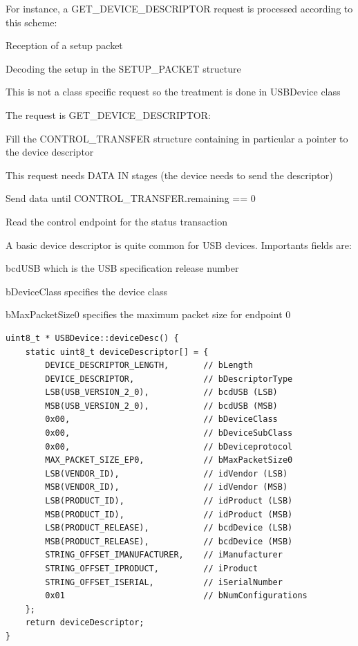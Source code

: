 \documentclass[pdftex,10pt,a4paper]{report}
\newenvironment{packed_item}{
\begin{itemize}
  \setlength{\itemsep}{1pt}
  \setlength{\parskip}{0pt}
  \setlength{\parsep}{0pt}
}{\end{itemize}}
\begin{document}
For instance, a GET\_DEVICE\_DESCRIPTOR request is processed according to this scheme:
\begin{packed_item}
	\item Reception of a setup packet
	\item Decoding the setup in the SETUP\_PACKET structure
	\item This is not a class specific request so the treatment is done in USBDevice class
	\item The request is GET\_DEVICE\_DESCRIPTOR:
	\begin{packed_item}
		\item Fill the CONTROL\_TRANSFER structure containing in particular a pointer to the device descriptor
		\item This request needs DATA IN stages (the device needs to send the descriptor)
		\item Send data until CONTROL\_TRANSFER.remaining == 0
		\item Read the control endpoint for the status transaction
	\end{packed_item}
\end{packed_item}


A basic device descriptor is quite common for USB devices. Importants fields are:
\begin{packed_item}	
	\item bcdUSB which is the USB specification release number
	\item bDeviceClass specifies the device class
	\item bMaxPacketSize0 specifies the maximum packet size for endpoint 0
\end{packed_item}

\begin{lstlisting}[label=Device Descriptor,caption=Device Descriptor]
uint8_t * USBDevice::deviceDesc() {
    static uint8_t deviceDescriptor[] = {
        DEVICE_DESCRIPTOR_LENGTH,       // bLength 
        DEVICE_DESCRIPTOR,              // bDescriptorType 
        LSB(USB_VERSION_2_0),           // bcdUSB (LSB) 
        MSB(USB_VERSION_2_0),           // bcdUSB (MSB) 
        0x00,                           // bDeviceClass 
        0x00,                           // bDeviceSubClass 
        0x00,                           // bDeviceprotocol 
        MAX_PACKET_SIZE_EP0,            // bMaxPacketSize0 
        LSB(VENDOR_ID),                 // idVendor (LSB) 
        MSB(VENDOR_ID),                 // idVendor (MSB) 
        LSB(PRODUCT_ID),                // idProduct (LSB) 
        MSB(PRODUCT_ID),                // idProduct (MSB) 
        LSB(PRODUCT_RELEASE),           // bcdDevice (LSB) 
        MSB(PRODUCT_RELEASE),           // bcdDevice (MSB) 
        STRING_OFFSET_IMANUFACTURER,    // iManufacturer 
        STRING_OFFSET_IPRODUCT,         // iProduct 
        STRING_OFFSET_ISERIAL,          // iSerialNumber 
        0x01                            // bNumConfigurations 
    };
    return deviceDescriptor;
}
\end{lstlisting}
\end{document}
